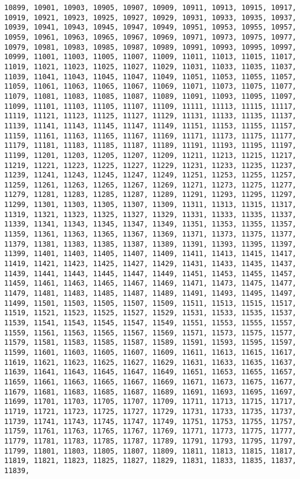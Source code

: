 \documentclass[11pt]{article}
\begin{document}
\begin{Verbatim}[commandchars=\\\{\}]
10899, 10901, 10903, 10905, 10907, 10909, 10911, 10913, 10915, 10917, 10919, 10921, 10923, 10925, 10927, 10929, 10931, 10933, 10935, 10937, 10939, 10941, 10943, 10945, 10947, 10949, 10951, 10953, 10955, 10957, 10959, 10961, 10963, 10965, 10967, 10969, 10971, 10973, 10975, 10977, 10979, 10981, 10983, 10985, 10987, 10989, 10991, 10993, 10995, 10997, 10999, 11001, 11003, 11005, 11007, 11009, 11011, 11013, 11015, 11017, 11019, 11021, 11023, 11025, 11027, 11029, 11031, 11033, 11035, 11037, 11039, 11041, 11043, 11045, 11047, 11049, 11051, 11053, 11055, 11057, 11059, 11061, 11063, 11065, 11067, 11069, 11071, 11073, 11075, 11077, 11079, 11081, 11083, 11085, 11087, 11089, 11091, 11093, 11095, 11097, 11099, 11101, 11103, 11105, 11107, 11109, 11111, 11113, 11115, 11117, 11119, 11121, 11123, 11125, 11127, 11129, 11131, 11133, 11135, 11137, 11139, 11141, 11143, 11145, 11147, 11149, 11151, 11153, 11155, 11157, 11159, 11161, 11163, 11165, 11167, 11169, 11171, 11173, 11175, 11177, 11179, 11181, 11183, 11185, 11187, 11189, 11191, 11193, 11195, 11197, 11199, 11201, 11203, 11205, 11207, 11209, 11211, 11213, 11215, 11217, 11219, 11221, 11223, 11225, 11227, 11229, 11231, 11233, 11235, 11237, 11239, 11241, 11243, 11245, 11247, 11249, 11251, 11253, 11255, 11257, 11259, 11261, 11263, 11265, 11267, 11269, 11271, 11273, 11275, 11277, 11279, 11281, 11283, 11285, 11287, 11289, 11291, 11293, 11295, 11297, 11299, 11301, 11303, 11305, 11307, 11309, 11311, 11313, 11315, 11317, 11319, 11321, 11323, 11325, 11327, 11329, 11331, 11333, 11335, 11337, 11339, 11341, 11343, 11345, 11347, 11349, 11351, 11353, 11355, 11357, 11359, 11361, 11363, 11365, 11367, 11369, 11371, 11373, 11375, 11377, 11379, 11381, 11383, 11385, 11387, 11389, 11391, 11393, 11395, 11397, 11399, 11401, 11403, 11405, 11407, 11409, 11411, 11413, 11415, 11417, 11419, 11421, 11423, 11425, 11427, 11429, 11431, 11433, 11435, 11437, 11439, 11441, 11443, 11445, 11447, 11449, 11451, 11453, 11455, 11457, 11459, 11461, 11463, 11465, 11467, 11469, 11471, 11473, 11475, 11477, 11479, 11481, 11483, 11485, 11487, 11489, 11491, 11493, 11495, 11497, 11499, 11501, 11503, 11505, 11507, 11509, 11511, 11513, 11515, 11517, 11519, 11521, 11523, 11525, 11527, 11529, 11531, 11533, 11535, 11537, 11539, 11541, 11543, 11545, 11547, 11549, 11551, 11553, 11555, 11557, 11559, 11561, 11563, 11565, 11567, 11569, 11571, 11573, 11575, 11577, 11579, 11581, 11583, 11585, 11587, 11589, 11591, 11593, 11595, 11597, 11599, 11601, 11603, 11605, 11607, 11609, 11611, 11613, 11615, 11617, 11619, 11621, 11623, 11625, 11627, 11629, 11631, 11633, 11635, 11637, 11639, 11641, 11643, 11645, 11647, 11649, 11651, 11653, 11655, 11657, 11659, 11661, 11663, 11665, 11667, 11669, 11671, 11673, 11675, 11677, 11679, 11681, 11683, 11685, 11687, 11689, 11691, 11693, 11695, 11697, 11699, 11701, 11703, 11705, 11707, 11709, 11711, 11713, 11715, 11717, 11719, 11721, 11723, 11725, 11727, 11729, 11731, 11733, 11735, 11737, 11739, 11741, 11743, 11745, 11747, 11749, 11751, 11753, 11755, 11757, 11759, 11761, 11763, 11765, 11767, 11769, 11771, 11773, 11775, 11777, 11779, 11781, 11783, 11785, 11787, 11789, 11791, 11793, 11795, 11797, 11799, 11801, 11803, 11805, 11807, 11809, 11811, 11813, 11815, 11817, 11819, 11821, 11823, 11825, 11827, 11829, 11831, 11833, 11835, 11837, 11839, 
\end{Verbatim}
\end{document}
